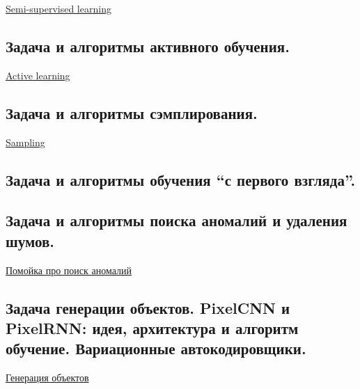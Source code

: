 \documentclass{article}
\begin{document}
\href{
	https://neerc.ifmo.ru/wiki/index.php?title=%
}{Semi-supervised learning}


\subsection{Задача и алгоритмы активного обучения.}

\href{
	https://neerc.ifmo.ru/wiki/index.php?title=%
}{Active learning}


\subsection{Задача и алгоритмы сэмплирования.}

\href{
	http://neerc.ifmo.ru/wiki/index.php?title=%
}{Sampling}


\subsection{Задача и алгоритмы обучения “с первого взгляда”.}


\subsection{Задача и алгоритмы поиска аномалий и удаления шумов.}

\href{
	https://dyakonov.org/2017/04/19/%
}{Помойка про поиск аномалий}


\subsection{Задача генерации объектов. PixelCNN и PixelRNN: идея, архитектура и
алгоритм обучение. Вариационные автокодировщики.}

\href{
	https://neerc.ifmo.ru/wiki/index.php?title=%
}{Генерация объектов}
\end{document}
